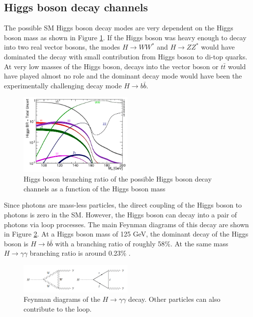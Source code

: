 \subsection{Higgs boson decay channels}
\label{chap1:EWSB:HD}
The possible SM Higgs boson decay modes are very dependent on the Higgs boson mass as shown in Figure \ref{fig:chap1:EWSB:BR}. If the Higgs boson was heavy enough to decay into two real vector bosons, the modes $H\rightarrow WW^*$ and $ H\rightarrow ZZ^*$ would have dominated the decay with small contribution from Higgs boson to di-top quarks. At very low masses of the Higgs boson, decays into the vector boson or $t\bar{t}$ would have played almost no role and the dominant decay mode would have been the experimentally challenging decay mode $H\rightarrow b\bar{b}$.
\begin{figure}[htbp]
    \centering
    \includegraphics[width=0.5\textwidth]{Ch1/Img/Higgs_Br.png}
    \caption{Higgs boson branching ratio of the possible Higgs boson decay channels as a function of the Higgs boson mass \cite{HiggsBR}}
    \label{fig:chap1:EWSB:BR}
\end{figure}
Since photons are mass-less particles, the direct coupling of the Higgs boson to photons is zero in the SM. However, the Higgs boson can decay into a pair of photons via loop processes. The main Feynman diagrams of this decay are shown in Figure \ref{fig:chap1:EWSB:Hgg}. 
At a Higgs boson mass of 125 GeV, the dominant decay of the Higgs boson is $H \rightarrow b\bar{b}$ with a branching ratio of roughly 58\%. At the same mass $H\rightarrow\gamma\gamma$ branching ratio is around 0.23\% \cite{HXSWG}.
\begin{figure}[htbp]
    \centering
    \includegraphics[width=0.5\textwidth]{Ch1/Img/H_to_gammagamma.png}
    \caption{Feynman diagrams of the $H\rightarrow\gamma\gamma$ decay. Other particles can also contribute to the loop.}
    \label{fig:chap1:EWSB:Hgg}
\end{figure}

